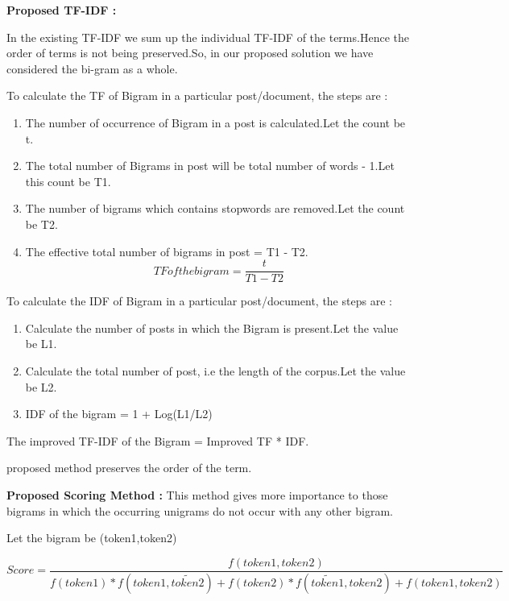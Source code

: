 \documentclass{mnnit}
\begin{document}
\textbf{Proposed TF-IDF :}

\noindent In the existing TF-IDF we sum up the individual TF-IDF of the terms.Hence the order of terms is not being preserved.So, in our proposed solution we have considered the bi-gram as a whole. 


\noindent To calculate the TF of Bigram in a particular post/document, the steps are :
\begin{enumerate}
\item The number of occurrence of Bigram in a post is calculated.Let the count be t.
\item The total number of Bigrams in post will be total number of words - 1.Let this count be T1.
\item  The number of bigrams which contains stopwords are removed.Let the count be  T2.
\item The effective total number of bigrams in post = T1 - T2.
    \[TF of the bigram    =     \frac{t}{ T1 - T2}	 \]
     	
				      	       
\end{enumerate}






\noindent To calculate the IDF of Bigram in a particular post/document, the steps are :

\begin{enumerate}
\item Calculate the number of posts in which the Bigram is present.Let the value be L1.
\item Calculate the total number of post, i.e the length of the corpus.Let the value be L2.
\item IDF of the bigram  = 		1 + Log(L1/L2)

\end{enumerate}

\noindent The improved TF-IDF of the Bigram = Improved TF * IDF.

\noindent  proposed method preserves the order of the term.





\vspace{3 mm}

\noindent \textbf{Proposed Scoring Method :}
This method gives more importance to those bigrams  in which the occurring unigrams do not occur with any other bigram. 

\noindent Let the bigram be (token1,token2)

\[
Score  =	\frac{f(token1,token2)}{f(token1)* f( token1, \widetilde{token2})   +  f(token2)* f( \widetilde{token1}, token2 )  +  f(token1,token2)}		\]	    
   
\end{document}
